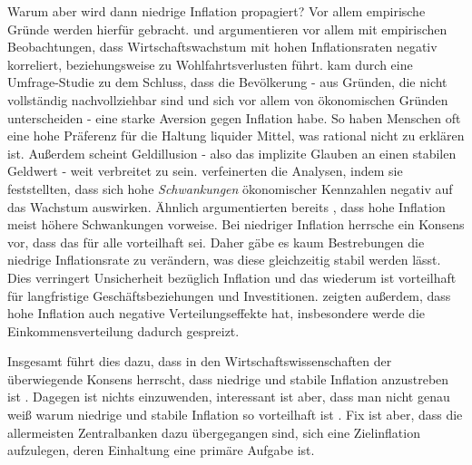 Warum aber wird dann niedrige Inflation propagiert? Vor allem empirische Gründe werden hierfür gebracht. \textcite{Fischer1993, Taylor1999, Akerlof1996} und \textcite{Lucas1994} argumentieren vor allem mit empirischen Beobachtungen, dass Wirtschaftswachstum mit hohen Inflationsraten negativ korreliert, beziehungsweise zu Wohlfahrtsverlusten führt. \textcite{Shiller1997} kam durch eine Umfrage-Studie zu dem Schluss, dass die Bevölkerung - aus Gründen, die nicht vollständig nachvollziehbar sind und sich vor allem von ökonomischen Gründen unterscheiden - eine starke Aversion gegen Inflation habe. So haben Menschen oft eine hohe Präferenz für die Haltung liquider Mittel, was rational nicht zu erklären ist. Außerdem scheint Geldillusion - also das implizite Glauben an einen stabilen Geldwert - weit verbreitet zu sein. \textcite{Ramey1995} verfeinerten die Analysen, indem sie feststellten, dass sich hohe \textit{Schwankungen} ökonomischer Kennzahlen negativ auf das Wachstum auswirken. Ähnlich argumentierten bereits \textcite{Ball1990}, dass hohe Inflation meist höhere Schwankungen vorweise. Bei niedriger Inflation herrsche ein Konsens vor, dass das für alle vorteilhaft sei. Daher gäbe es kaum Bestrebungen die niedrige Inflationsrate zu verändern, was diese gleichzeitig stabil werden lässt. Dies verringert Unsicherheit bezüglich Inflation und das wiederum ist vorteilhaft für langfristige Geschäftsbeziehungen und Investitionen. \textcite{Romer1998} zeigten außerdem, dass hohe Inflation auch negative Verteilungseffekte hat, insbesondere werde die Einkommensverteilung dadurch gespreizt.

Insgesamt führt dies dazu, dass in den Wirtschaftswissenschaften der überwiegende Konsens herrscht, dass niedrige und stabile Inflation anzustreben ist \parencite[S. 411]{Snowdon2005}. Dagegen ist nichts einzuwenden, interessant ist aber, dass man nicht genau weiß warum niedrige und stabile Inflation so vorteilhaft ist \parencite[S. 591]{Romer2018}. Fix ist aber, dass die allermeisten Zentralbanken dazu übergegangen sind, sich eine Zielinflation aufzulegen, deren Einhaltung eine primäre Aufgabe ist.

